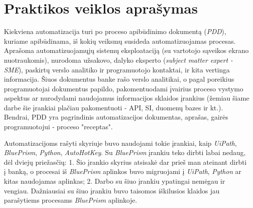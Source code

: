 \documentclass{VUMIFPSBakPrakAt}
\begin{document}
\section{Praktikos veiklos aprašymas}

\begin{comment}
Praktikos veiklos aprašymas (vienas arba keli skyriai). Aprašomas praktikos užduoties
įgyvendinimas (pvz., atlikti projektavimo ir/ar programavimo darbai, sukurtas modelis, priimti
sprendimai ir pan.).
\end{comment}

Kiekviena automatizacija turi po proceso apibūdinimo dokumentą (\textit{PDD}), kuriame apibūdinama, iš kokių veiksmų susideda automatizuojamas procesas. Aprašoma automatizuojamųjų sistemų eksploataciją (su vartotojo sąveikos ekrano nuotraukomis), nurodoma užsakovo, dalyko eksperto (\textit{subject matter expert - SME}), paskirtų verslo analitiko ir programuotojo kontaktai, ir kita vertinga informacija. Šiuos dokumentus banke rašo verslo analitikai, o pagal poreikius programuotojai dokumentus papildo, pakomentuodami įvairius proceso vystymo aspektus ar nurodydami naudojamus informacijos sklaidos įrankius (žemiau šiame darbe šie įrankiai plačiau pakomentuoti - API, SI, duomenų bazes ir kt.). Bendrai, PDD yra pagrindinis automatizacijos dokumentas, aprašas, gairės programuotojui - proceso "receptas".
\par
Automatizacijoms rašyti skyriuje buvo naudojami tokie įrankiai, kaip \textit{UiPath}, \textit{BluePrism}, \textit{Python}, \textit{AutoHotKey}. Su \textit{BluePrism} \cite{BluePrism} įrankiu teko dirbti labai nedaug, dėl dviejų priežasčių: 1. Šio įrankio skyrius atsisakė dar prieš man ateinant dirbti į banką, o procesai iš \textit{BluePrism} aplinkos buvo migruojami į \textit{UiPath}, \textit{Python} ar kitas naudojamas aplinkas; 2. Darbo su šiuo įrankiu ypatingai nemėgau ir vengiau. Dažniausiai su šiuo įrankiu buvo taisomos iškilusios klaidos jau parašytiems procesams \textit{BluePrism} aplinkoje.
\par
\end{document}
